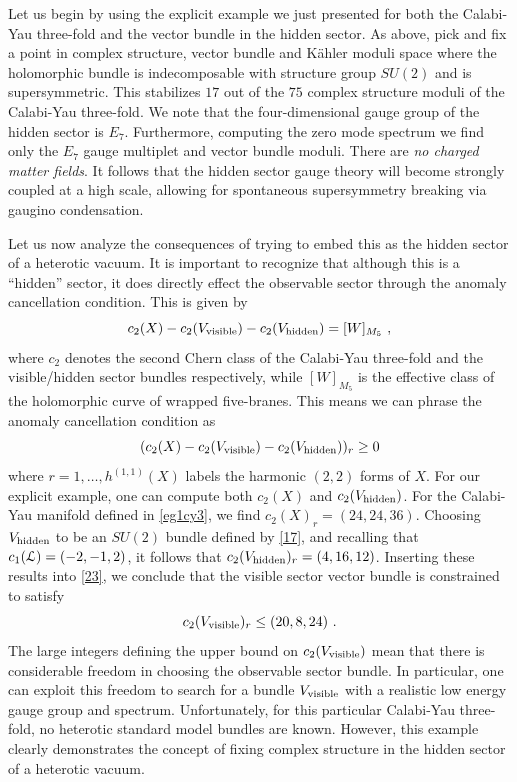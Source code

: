 \documentclass[12pt]{article}
\numberwithin{equation}{section}
\begin{document}
Let us begin by using the explicit example we just presented for both the Calabi-Yau three-fold and the vector bundle in the hidden sector. As above, pick and fix a point in complex structure, vector bundle and K\"ahler moduli space where the holomorphic bundle is indecomposable with structure group $SU(2)$ and is supersymmetric.  This stabilizes $17$ out of the $75$ complex structure moduli of the Calabi-Yau three-fold. We note that the four-dimensional gauge group of the hidden sector is $E_{7}$. Furthermore, computing the zero mode spectrum we find only the $E_{7}$ gauge multiplet and vector bundle moduli. There are {\it no charged matter fields}. It follows that the hidden sector gauge theory will become strongly coupled at a high scale, allowing for spontaneous supersymmetry breaking via gaugino condensation.

 Let us now analyze the consequences of trying to embed this as the hidden sector of a heterotic vacuum. It is important to recognize that although this is a ``hidden'' sector, it does directly effect the observable sector through the anomaly cancellation condition. This is given by
%
\begin{equation}
c_{2}(X)-c_{2}(V_{\rm visible})-c_{2}(V_{\rm hidden})=[W]_{M_{5}} \ ,
\label{22}
\end{equation}
%
where $c_{2}$ denotes the second Chern class of the Calabi-Yau three-fold and the visible/hidden sector bundles respectively, while $[W]_{M_{5}}$ is the effective class of the holomorphic curve of wrapped five-branes. This means we can phrase the anomaly cancellation condition as
%
\begin{equation}
(c_{2}(X)-c_{2}(V_{\rm visible})-c_{2}(V_{\rm hidden}))_r \geq 0 
\label{23}
\end{equation}
%
where $r=1,\ldots ,h^{(1,1)}(X)$ labels the harmonic $(2,2)$ forms of $X$. For our explicit example, one can compute both $c_{2}(X)$ and $c_{2}(V_{\rm hidden})$.
For the Calabi-Yau manifold defined in \eqref{eg1cy3}, we find $c_{2}(X)_{r}= (24,24,36)$. Choosing $V_{\rm hidden}$ to be an $SU(2)$ bundle defined by \eqref{17}, and recalling that $c_{1}({\cal{L}})=(-2,-1,2)$, it follows that $c_{2}(V_{\rm hidden})_{r}= (4,16,12)$. Inserting these results into \eqref{23}, we conclude that the visible sector vector bundle is constrained to satisfy
%
\begin{equation}
c_{2}(V_{\rm visible})_{r} \leq (20,8,24) \ .
\label{27}
\end{equation}
%
The large integers defining the upper bound on $c_{2}(V_{\rm visible})$ mean that there is considerable freedom in choosing the observable sector bundle. In particular, one can exploit this freedom to search for a bundle $V_{\rm visible}$ with a realistic low energy gauge group and spectrum. Unfortunately, for this particular Calabi-Yau three-fold, no heterotic standard model bundles are known. However, this example clearly demonstrates the concept of fixing complex structure in the hidden sector of a heterotic vacuum. 
\end{document}
